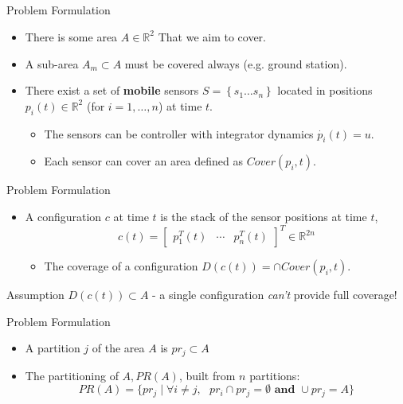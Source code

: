\documentclass[t]{beamer}
\newcommand{\rR}{\mathbb{R}}
\newcommand{\bmat}[1]{\begin{bmatrix}#1\end{bmatrix}}
\begin{document}
\subsection[Problem Formulation]{}
\begin{frame}[label=probformulation1]{Problem Formulation}
\begin{itemize}
\item There is some area $A \in \rR^{2}$ That we aim to cover.
\item A sub-area $A_{m} \subset A$ must be covered always (e.g. ground station).
\item There exist a set of \textbf{mobile} sensors $S = \left\{s_1 \ldots s_n\right\}$ located in positions $p_i(t) \in \mathbb{R}^2$ (for $i=1,\ldots,n$) at time $t$.
\begin{itemize}
\item The sensors can be controller with integrator dynamics $\dot{p_i}(t) = u$.
\item Each sensor can cover an area defined as $Cover\left( p_i, t \right)$.
\end{itemize}
\end{itemize}
\end{frame}
\begin{frame}[label=probformulation2]{Problem Formulation}
\begin{itemize}
\item A configuration $c$ at time $t$ is the stack of the sensor positions at time $t$,
\begin{equation*}
c\left(t\right) = \bmat{
p_{1}^{T}\left(t\right)&\cdots&p_{n}^{T}\left(t\right)}^{T}\in\mathbb{R}^{2n}
\end{equation*}
\begin{itemize}
\item The coverage of a configuration $D\left( c\left( t \right) \right) = \cap Cover\left( p_i, t \right)$.
\end{itemize}
\end{itemize}
\begin{block}{Assumption}
$D\left( c\left( t \right) \right) \subset A$ - a single configuration \emph{can't} provide full coverage!
\end{block}
\end{frame}
\begin{frame}[label=probformulation2]{Problem Formulation}
\begin{itemize}
\item A partition $j$ of the area $A$ is $pr_{j} \subset A$
\item The partitioning of $A, PR\left( A \right)$, built from $n$ partitions:
\begin{equation*}
PR\left( A \right) = \{ pr_{j} \mid \forall i \neq j,\textbf{ } pr_{i}\cap pr_{j} = \emptyset \textbf{ and }\cup pr_{j} = A \}
\end{equation*}
\end{itemize}
\end{frame}
\end{document}
